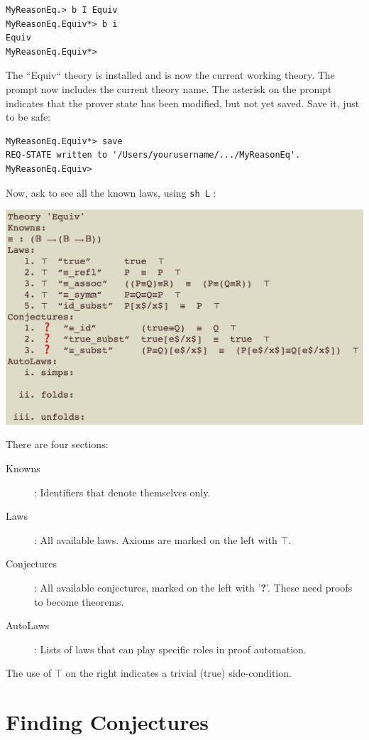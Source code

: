 \documentclass[11pt]{article}
\begin{document}
\begin{verbatim}
MyReasonEq.> b I Equiv
MyReasonEq.Equiv*> b i
Equiv
MyReasonEq.Equiv*> 
\end{verbatim}

The ``Equiv`` theory is installed and is now the current working theory. The prompt now includes the current theory name. The asterisk on the prompt indicates that the prover state has been modified, but not yet saved.
Save it, just to be safe:

\begin{verbatim}
MyReasonEq.Equiv*> save
REQ-STATE written to '/Users/yourusername/.../MyReasonEq'.
MyReasonEq.Equiv>      
\end{verbatim}

\newpage
Now, ask to see all the known laws, using \verb"sh L" :

\includegraphics[scale=0.75]{doc/images/theory-equiv.png}

There are four sections:
\begin{description}
\item[Knowns]: Identifiers that denote themselves only.
\item[Laws]: All available laws. 
  Axioms are marked on the left with $\top$.
\item[Conjectures]: All available conjectures, 
  marked on the left with '{\color{red}\textbf ?}'. 
  These need proofs to become theorems.
\item[AutoLaws]: Lists of laws that can play specific roles
  in proof automation.
\end{description}
The use of $\top$ on the right indicates 
a trivial (true) side-condition.

\newpage
\section{Finding Conjectures}
\end{document}
